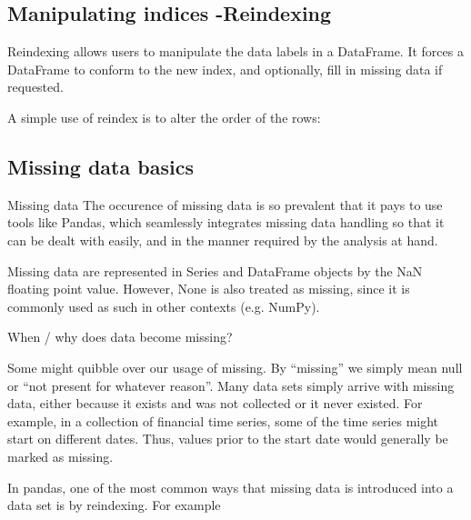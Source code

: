 \documentclass[11pt]{article} %
\begin{document}
\newpage
\subsection{Manipulating indices -Reindexing}

Reindexing allows users to manipulate the data labels in a DataFrame. It forces a DataFrame to conform to the new index, and optionally, fill in missing data if requested.


A simple use of reindex is to alter the order of the rows:
\newpage
\subsection{Missing data basics}
Missing data
The occurence of missing data is so prevalent that it pays to use tools like Pandas, which seamlessly integrates missing data handling so that it can be dealt with easily, and in the manner required by the analysis at hand.

Missing data are represented in Series and DataFrame objects by the NaN floating point value. However, None is also treated as missing, since it is commonly used as such in other contexts (e.g. NumPy).


When / why does data become missing?

Some might quibble over our usage of missing. By “missing” we simply mean null or “not present for whatever reason”. Many data sets simply arrive with missing data, either because it exists and was not collected or it never existed. For example, in a collection of financial time series, some of the time series might start on different dates. Thus, values prior to the start date would generally be marked as missing.

In pandas, one of the most common ways that missing data is introduced into a data set is by reindexing. For example
\end{document}
